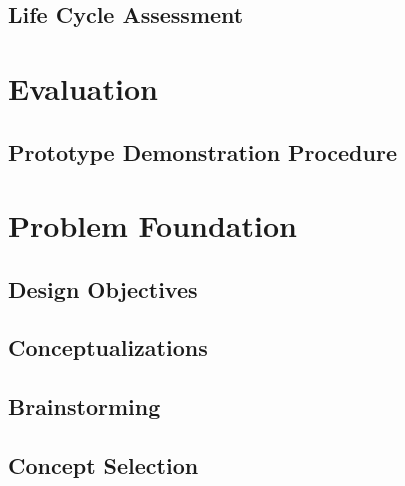 \documentclass{article}
\begin{document}
\subsection{Life Cycle Assessment}








\section{Evaluation} \label{eval}
\subsection{Prototype Demonstration Procedure}


\newpage
\appendix
\appendixpage

\section{Problem Foundation}
\subsection{Design Objectives}


\subsection{Conceptualizations}

\subsection{Brainstorming}

\subsection{Concept Selection}

\end{document}
